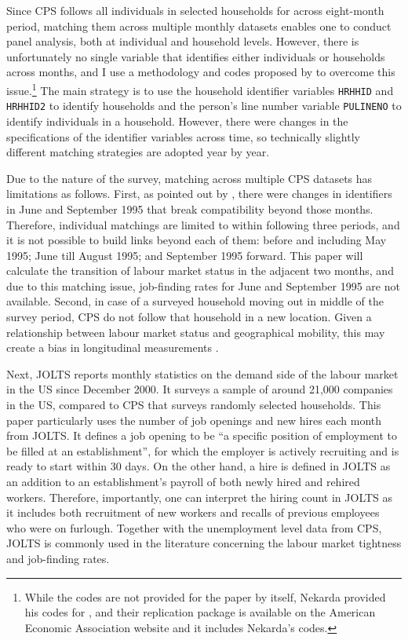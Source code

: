 \documentclass[a4paper, 11pt, tikz]{article}
\begin{document}


Since CPS follows all individuals in selected households for across eight-month period, matching them across multiple monthly datasets enables one to conduct panel analysis, both at individual and household levels.
However, there is unfortunately no single variable that identifies either individuals or households across months, and I use a methodology and codes proposed by \cite{nekarda2009longitudinal} to overcome this issue.\footnote{While the codes are not provided for the paper by itself, Nekarda provided his codes for \cite{hall2018measuring}, and their replication package is available on the American Economic Association website and it includes Nekarda's codes.}
The main strategy is to use the household identifier variables \texttt{HRHHID} and \texttt{HRHHID2} to identify households and the person's line number variable \texttt{PULINENO} to identify individuals in a household.
However, there were changes in the specifications of the identifier variables across time, so technically slightly different matching strategies are adopted year by year.

Due to the nature of the survey, matching across multiple CPS datasets has limitations as follows.
First, as pointed out by \cite{pacas2015using}, there were changes in identifiers in June and September 1995 that break compatibility beyond those months.
Therefore, individual matchings are limited to within following three periods, and it is not possible to build links beyond each of them: before and including May 1995; June till August 1995; and September 1995 forward.
This paper will calculate the transition of labour market status in the adjacent two months, and due to this matching issue, job-finding rates for June and September 1995 are not available.
Second, in case of a surveyed household moving out in middle of the survey period, CPS do not follow that household in a new location.
Given a relationship between labour market status and geographical mobility, this may create a bias in longitudinal measurements \citep{nekarda2009longitudinal}.

Next, JOLTS reports monthly statistics on the demand side of the labour market in the US since December 2000.
It surveys a sample of around 21,000 companies in the US, compared to CPS that surveys randomly selected households.
This paper particularly uses the number of job openings and new hires each month from JOLTS.
It defines a job opening to be ``a specific position of employment to be filled at an establishment'', for which the employer is actively recruiting and is ready to start within 30 days.
On the other hand, a hire is defined in JOLTS as an addition to an establishment's payroll of both newly hired and rehired workers.
Therefore, importantly, one can interpret the hiring count in JOLTS as it includes both recruitment of new workers and recalls of previous employees who were on furlough.
Together with the unemployment level data from CPS, JOLTS is commonly used in the literature concerning the labour market tightness and job-finding rates.
\end{document}
